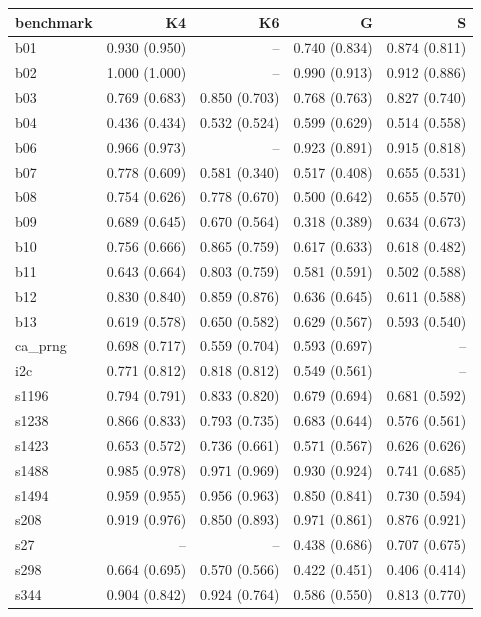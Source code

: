 \begin{tabular}{@{}lrrrr@{}}
\toprule
benchmark & K4 & K6 & G & S \\
\midrule
b01 & 0.930 (0.950) & -- & 0.740 (0.834) & 0.874 (0.811) \\
b02 & 1.000 (1.000) & -- & 0.990 (0.913) & 0.912 (0.886) \\
b03 & 0.769 (0.683) & 0.850 (0.703) & 0.768 (0.763) & 0.827 (0.740) \\
b04 & 0.436 (0.434) & 0.532 (0.524) & 0.599 (0.629) & 0.514 (0.558) \\
b06 & 0.966 (0.973) & -- & 0.923 (0.891) & 0.915 (0.818) \\
b07 & 0.778 (0.609) & 0.581 (0.340) & 0.517 (0.408) & 0.655 (0.531) \\
b08 & 0.754 (0.626) & 0.778 (0.670) & 0.500 (0.642) & 0.655 (0.570) \\
b09 & 0.689 (0.645) & 0.670 (0.564) & 0.318 (0.389) & 0.634 (0.673) \\
b10 & 0.756 (0.666) & 0.865 (0.759) & 0.617 (0.633) & 0.618 (0.482) \\
b11 & 0.643 (0.664) & 0.803 (0.759) & 0.581 (0.591) & 0.502 (0.588) \\
b12 & 0.830 (0.840) & 0.859 (0.876) & 0.636 (0.645) & 0.611 (0.588) \\
b13 & 0.619 (0.578) & 0.650 (0.582) & 0.629 (0.567) & 0.593 (0.540) \\
ca\_prng & 0.698 (0.717) & 0.559 (0.704) & 0.593 (0.697) & -- \\
i2c & 0.771 (0.812) & 0.818 (0.812) & 0.549 (0.561) & -- \\
s1196 & 0.794 (0.791) & 0.833 (0.820) & 0.679 (0.694) & 0.681 (0.592) \\
s1238 & 0.866 (0.833) & 0.793 (0.735) & 0.683 (0.644) & 0.576 (0.561) \\
s1423 & 0.653 (0.572) & 0.736 (0.661) & 0.571 (0.567) & 0.626 (0.626) \\
s1488 & 0.985 (0.978) & 0.971 (0.969) & 0.930 (0.924) & 0.741 (0.685) \\
s1494 & 0.959 (0.955) & 0.956 (0.963) & 0.850 (0.841) & 0.730 (0.594) \\
s208 & 0.919 (0.976) & 0.850 (0.893) & 0.971 (0.861) & 0.876 (0.921) \\
s27 & -- & -- & 0.438 (0.686) & 0.707 (0.675) \\
s298 & 0.664 (0.695) & 0.570 (0.566) & 0.422 (0.451) & 0.406 (0.414) \\
s344 & 0.904 (0.842) & 0.924 (0.764) & 0.586 (0.550) & 0.813 (0.770) \\

\end{tabular}
